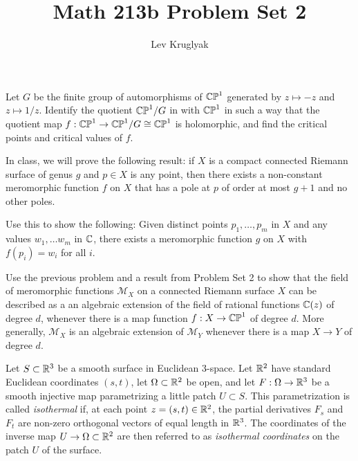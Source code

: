 \documentclass{lkx_pset}
\title{Math 213b Problem Set 2}
\author{Lev Kruglyak}
\begin{document}
\maketitle

\begin{problem}{1}
Let $G$ be the finite group of automorphisms of $\mathbb{CP}^{1}$ generated by
$z\mapsto -z$ and $z\mapsto 1/z$. Identify the quotient $\mathbb{CP}^{1}/G$ in
with $\mathbb{CP}^{1}$ in such a way that the quotient map $f: \mathbb{CP}^{1}\to
	\mathbb{CP}^{1}/G \cong \mathbb{CP}^{1}$ is holomorphic, and find the critical points
and critical values of $f$.
\end{problem}

\begin{problem}{2}
In class, we will prove the
following result: if $X$ is a compact connected Riemann surface of
genus $g$ and $p\in X$ is any point, then there exists a non-constant meromorphic
function $f$ on $X$ that has a pole at $p$ of order at most $g+1$ and
no other poles.
\end{problem}

\begin{parts}
	\begin{part}
		Use this to show the following: Given
		distinct points $p_{1},\dots, p_{m}$ in $X$ and any values
		$w_{1},\dots w_{m}$ in $\mathbb{C}$, there exists a meromorphic function $g$
		on $X$ with $f(p_{i})=w_{i}$ for all $i$.
	\end{part}
\end{parts}

\begin{problem}{3}
Use the previous problem and a result from Problem Set 2 to show that
the field of meromorphic functions $\mathcal{M}_{X}$ on a connected
Riemann surface $X$ can be described as a an algebraic extension of
the field of rational functions $\mathbb{C}(z)$ of degree  $d$,
whenever there is a map function $f:X\to \mathbb{CP}^{1}$ of degree $d$.
More generally, $\mathcal{M}_{X}$ is an algebraic extension of
$\mathcal{M}_{Y}$ whenever there is a map $X\to Y$ of degree $d$.
\end{problem}

\begin{problem}{4}
Let $S\subset \mathbb{R}^{3}$ be a smooth surface in Euclidean 3-space.
Let $\mathbb{R}^{2}$ have standard Euclidean coordinates $(s,t)$, let
$\Omega\subset \mathbb{R}^{2}$ be open, and let $F:\Omega\to \mathbb{R}^{3}$ be a
smooth injective map parametrizing a little patch $U \subset S$. This
parametrization is called \emph{isothermal} if, at each point $z =(s,t) \in \mathbb{R}^{2}$,
the partial derivatives $F_{s}$ and $F_{t}$ are non-zero orthogonal
vectors of equal length in $\mathbb{R}^{3}$. The coordinates of the inverse map $U\to
	\Omega\subset \mathbb{R}^{2}$ are then referred to as \emph{isothermal coordinates} on the patch $U$ of the surface.
\end{problem}
\end{document}
